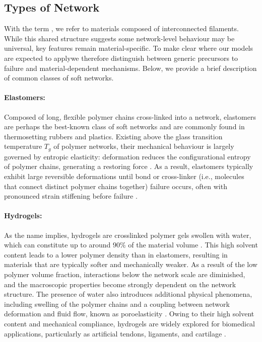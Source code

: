 \documentclass[asymmetricmargins]{library/duthesis}%
\providecommand{\DIFadd}[1]{{\protect\color{blue}\uwave{#1}}} %
\providecommand{\DIFaddbegin}{} %
\providecommand{\DIFaddend}{} %
\begin{document}
\subsection{Types of Network} \label{sec:TypesOfNetworks}
With the term , we refer to materials composed of interconnected filaments. While this shared structure suggests some network-level behaviour may be universal, key features remain material-specific. To make clear where our models are expected to apply\DIFaddbegin \DIFadd{, }\DIFaddend we therefore distinguish between generic precursors to failure and material-dependent mechanisms. Below, we provide a brief description of common classes of soft networks.

\paragraph{Elastomers:}
Composed of long, flexible polymer chains cross-linked into a network, elastomers are perhaps the best-known class of soft networks and are commonly found in thermosetting rubbers and plastics. Existing above the glass transition temperature $T_g$ of polymer networks, their mechanical behaviour is largely governed by entropic elasticity: deformation reduces the configurational entropy of polymer chains, generating a restoring force \cite{treloarElasticityRelatedProperties1973}. As a result, elastomers typically exhibit large reversible deformations until bond or cross-linker (i.e., molecules that connect distinct polymer chains together) failure occurs, often with pronounced strain stiffening before failure \cite{kimMeasurementNonlinearMechanical2011}.

\paragraph{Hydrogels:}
As the name implies, hydrogels are crosslinked polymer gels swollen with water, which can constitute up to around $90\%$ of the material volume \cite{gong_why_2010,tanaka_determination_2005,sun_highly_2012}. This high solvent content leads to a lower polymer density than in elastomers, resulting in materials that are typically softer and mechanically weaker. As a result of the low polymer volume fraction, interactions below the network scale are diminished, and the macroscopic properties become strongly dependent on the network structure. The presence of water also introduces additional physical phenomena, including swelling of the polymer chains and a coupling between network deformation and fluid flow, known as poroelasticity \cite{biotTheoryFiniteDeformations1972}. Owing to their high solvent content and mechanical compliance, hydrogels are widely explored for biomedical applications, particularly as artificial tendons, ligaments, and cartilage \cite{yasudaNovelDoubleNetworkHydrogel2009,yinSelfHealingHydrogelsSynthesis2023,hoHydrogelsPropertiesApplications2022}.
\end{document}
